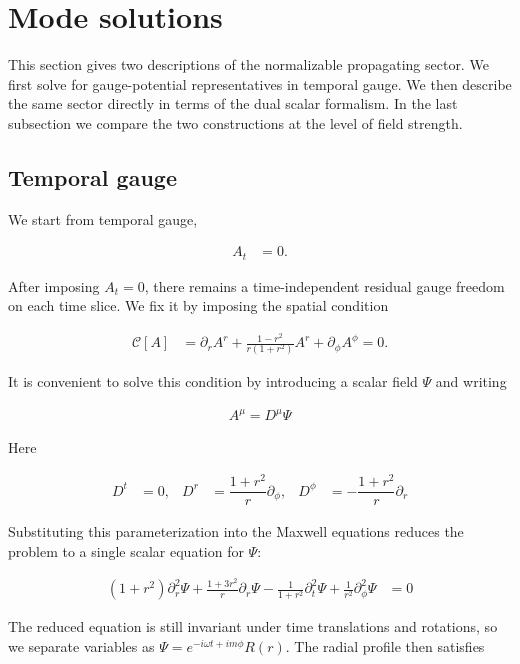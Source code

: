 \section{Mode solutions}\label{sec:mode-solutions}

This section gives two descriptions of the normalizable propagating sector. We first solve for gauge-potential representatives in temporal gauge. We then describe the same sector directly in terms of the dual scalar formalism. In the last subsection we compare the two constructions at the level of field strength.

\subsection{Temporal gauge}\label{subsec:temporal-gauge}

We start from temporal gauge,

\begin{align}
A_{t}&=0.
\end{align}

After imposing $A_{t}=0$, there remains a time-independent residual gauge freedom on each time slice. We fix it by imposing the spatial condition

\begin{align}
\mathcal{C}[A]&=\partial_{r}A^{r}+\frac{1-r^{2}}{r(1+r^{2})}A^{r}+\partial_{\phi}A^{\phi}=0.
\end{align}

It is convenient to solve this condition by introducing a scalar field $\Psi$ and writing

\begin{align}
A^{\mu}=D^{\mu}\Psi
\end{align}

Here

\begin{align}
D^{t} & =0, & D^{r} & =\dfrac{1+r^{2}}{r}\partial _{\phi}, & D^{\phi} & =-\dfrac{1+r^{2}}{r}\partial _{r}
\end{align}

Substituting this parameterization into the Maxwell equations reduces the problem to a single scalar equation for $\Psi$:

\begin{align}
(1+r^{2})\partial_{r}^{2}\Psi+\frac{1+3r^{2}}{r}\partial_{r}\Psi-\frac{1}{1+r^{2}}\partial_{t}^{2}\Psi+\frac{1}{r^{2}}\partial_{\phi}^{2}\Psi & =0
\end{align}

The reduced equation is still invariant under time translations and rotations, so we separate variables as $\Psi=e^{-i\omega t+im\phi}R(r)$. The radial profile then satisfies

